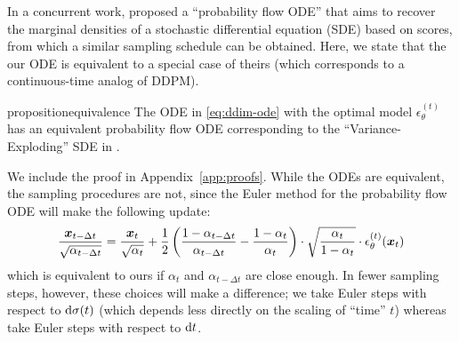 In a concurrent work, \citep{song2020score} proposed a ``probability flow ODE'' that aims to recover the marginal densities of a stochastic differential equation (SDE) based on scores, from which a similar sampling schedule can be obtained. Here, we state that the our ODE is equivalent to a special case of theirs (which corresponds to a continuous-time analog of DDPM).
\begin{restatable}{proposition}{equivalence}
The ODE in \eqref{eq:ddim-ode} with the optimal model $\epsilon_\theta^{(t)}$ has an equivalent probability flow ODE corresponding to the ``Variance-Exploding'' SDE in \citet{song2020score}.
\end{restatable}
We include the proof in Appendix~\ref{app:proofs}. While the ODEs are equivalent, the sampling procedures are not, since the Euler method for the probability flow ODE will make the following update:
\begin{align}
    \frac{{\bm{x}}_{t-\Delta t}}{\sqrt{\alpha_{t-\Delta t}}}  = \frac{{\bm{x}}_t}{\sqrt{\alpha_t}}  + \frac{1}{2}\left(\frac{1 - \alpha_{t-\Delta t}}{\alpha_{t-\Delta t}} - \frac{1 - \alpha_{t}}{\alpha_t}\right) \cdot \sqrt{\frac{\alpha_t}{1 - \alpha_t}} \cdot \epsilon_\theta^{(t)}({\bm{x}}_t) \label{eq:pf-euler}
\end{align}
which is equivalent to ours if $\alpha_t$ and $\alpha_{t-\Delta t}$ are close enough. In fewer sampling steps, however, these choices will make a difference; we take Euler steps with respect to $\mathrm{d} \sigma(t)$ (which depends less directly on the scaling of ``time'' $t$) whereas \citet{song2020score} take Euler steps with respect to $\mathrm{d} t$.



